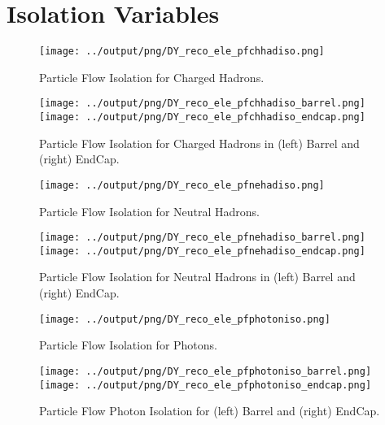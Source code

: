 \documentclass[11pt]{book}
\begin{document}
\section{Isolation Variables}

\begin{figure}[ht]
\centering
\texttt{[image: ../output/png/DY\_reco\_ele\_pfchhadiso.png]}
\caption{Particle Flow Isolation for Charged Hadrons.}
\label{fig:dy_reco_ele_pfchhadiso}
\end{figure}

\begin{figure}[ht]
\centering
\texttt{[image: ../output/png/DY\_reco\_ele\_pfchhadiso\_barrel.png]}
\texttt{[image: ../output/png/DY\_reco\_ele\_pfchhadiso\_endcap.png]}
\caption{Particle Flow Isolation for Charged Hadrons in (left) Barrel and (right) EndCap.}
\label{fig:dy_reco_ele_pfchhadiso_regions}
\end{figure}

\begin{figure}[ht]
\centering
\texttt{[image: ../output/png/DY\_reco\_ele\_pfnehadiso.png]}
\caption{Particle Flow Isolation for Neutral Hadrons.}
\label{fig:dy_reco_ele_pfnehadiso}
\end{figure}

\begin{figure}[ht]
\centering
\texttt{[image: ../output/png/DY\_reco\_ele\_pfnehadiso\_barrel.png]}
\texttt{[image: ../output/png/DY\_reco\_ele\_pfnehadiso\_endcap.png]}
\caption{Particle Flow Isolation for Neutral Hadrons in (left) Barrel and (right) EndCap.}
\label{fig:dy_reco_ele_pfnehadiso_regions}
\end{figure}

\begin{figure}[ht]
\centering
\texttt{[image: ../output/png/DY\_reco\_ele\_pfphotoniso.png]}
\caption{Particle Flow Isolation for Photons.}
\label{fig:dy_reco_ele_pfphotoniso}
\end{figure}

\begin{figure}[ht]
\centering
\texttt{[image: ../output/png/DY\_reco\_ele\_pfphotoniso\_barrel.png]}
\texttt{[image: ../output/png/DY\_reco\_ele\_pfphotoniso\_endcap.png]}
\caption{Particle Flow Photon Isolation for (left) Barrel and (right) EndCap.}
\label{fig:dy_reco_ele_pfphotoniso_regions}
\end{figure}
\end{document}
